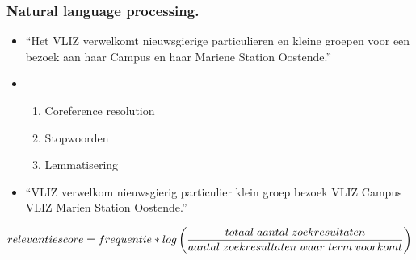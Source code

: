 \documentclass[aspectratio=169]{beamer}
\begin{document}
\begin{frame}[t]
\begin{columns}[t]
\begin{column}{.5\textwidth}
\begin{listing}
                
            \end{listing}
        \end{column}
    \end{columns}
\end{frame}

\begin{frame}
\frametitle{Natural language processing.}
\begin{itemize}
    \item ``Het \colorbox{hgorange}{VLIZ} verwelkomt nieuwsgierige particulieren en kleine groepen voor een bezoek aan haar Campus en haar Mariene Station Oostende.''
    \item \begin{enumerate}
        \item Coreference resolution
        \item Stopwoorden
        \item Lemmatisering
    \end{enumerate}
    \item ``\colorbox{hgorange}{VLIZ} verwelkom nieuwsgierig particulier klein groep bezoek \colorbox{hgorange}{VLIZ} Campus \colorbox{hgorange}{VLIZ} Marien Station Oostende.''
\end{itemize}
\[
relevantiescore = frequentie \ast log\left(\frac{totaal \hspace{1mm} aantal \hspace{1mm}  zoekresultaten}{aantal \hspace{1mm}  zoekresultaten \hspace{1mm}  waar \hspace{1mm}  term \hspace{1mm}  voorkomt}\right)
\] 



\end{frame}
\end{document}
